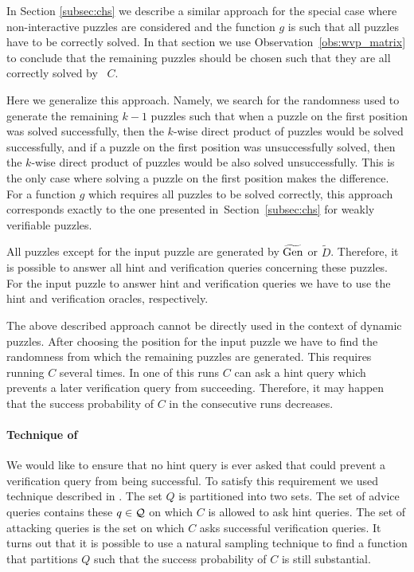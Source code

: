 In Section \ref{subsec:chs} we describe a similar approach for the special case where
non-interactive puzzles are considered and the function $g$ is such that all puzzles have to be correctly solved.
In that section we use Observation~\ref{obs:wvp_matrix} to conclude that the remaining puzzles should be chosen such that they
are all correctly solved by~ $C$.

Here we generalize this approach. Namely, we search for the randomness used to generate the remaining $k\!-\!1$ puzzles
such that when a puzzle on the first position was solved successfully, then the $k$-wise direct product of puzzles would be solved successfully,
and if a puzzle on the first position was unsuccessfully solved, then the $k$-wise direct product of puzzles would be also solved unsuccessfully.
This is the only case where solving a puzzle on the first position makes the difference.
For a function $g$ which requires all puzzles to be solved correctly,
this approach corresponds exactly to the one presented in~Section~\ref{subsec:chs} for weakly verifiable puzzles.

All puzzles except for the input puzzle are generated by $\widetilde{\operatorname{\text{Gen}}}$ or $\widetilde{D}$.
Therefore, it is possible to answer all hint and verification queries concerning these puzzles.
For the input puzzle to answer hint and verification queries we have to use the hint and verification oracles, respectively.

The above described approach cannot be directly used in the context of dynamic puzzles.
After choosing the position for the input puzzle we have to find the randomness from which the remaining puzzles are generated.
This requires running $C$ several times. In one of this runs $C$ can ask a hint query which prevents a later verification query from succeeding.
Therefore, it may happen that the success probability of $C$ in the consecutive runs decreases.

\paragraph{Technique of \cite{dodis2009security}}
We would like to ensure that no hint query is ever asked that could prevent a verification query from being successful.
To satisfy this requirement we used technique described in \cite{dodis2009security}.
The set $Q$ is partitioned into two sets. The set of advice queries contains these $q \in \mathcal{Q}$ on which
$C$ is allowed to ask hint queries. The set of attacking queries is the set on which $C$ asks successful verification queries.
It turns out that it is possible to use a natural sampling technique to find a function that partitions $Q$ such that
the success probability of $C$ is still substantial.

